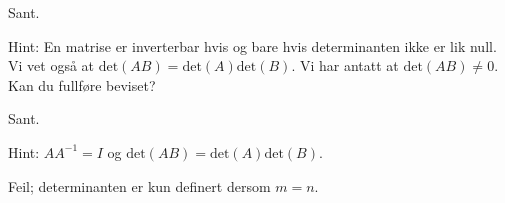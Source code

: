\begin{losning}

\begin{punkt}
Sant.

\noindent
Hint: En matrise er inverterbar hvis og bare hvis determinanten ikke er lik null. Vi vet også at $\text{det}(AB)=\text{det}(A)\text{det}(B)$. Vi har antatt at $\text{det}(AB)\neq 0$. Kan du fullføre beviset?
\end{punkt}

\begin{punkt}
Sant.

\noindent
Hint: $AA^{-1}=I$ og $\text{det}(AB)=\text{det}(A)\text{det}(B)$.
\end{punkt}

\begin{punkt}
Feil; determinanten er kun definert dersom $m=n$.
\end{punkt}

\end{losning}



